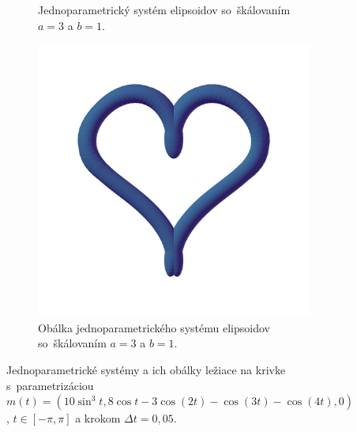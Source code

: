 \begin{figure}[h]
\begin{subfigure}[t]{0.49\textwidth}
        	\caption{Jednoparametrický systém elipsoidov so~škálovaním $a=3$ a $b=1$.}
        \label{fig:plocha13}
    \end{subfigure}
    \hfill
    \begin{subfigure}[t]{0.49\textwidth}
        \centering
        \includegraphics[width=\textwidth, trim=0mm 100mm 0mm 50mm, clip=true]{images/heart_envelope_ellipsoids2.png}
        	\caption{Obálka jednoparametrického systému elipsoidov so~škálovaním $a=3$ a $b=1$.}
        \label{fig:plocha14}
    \end{subfigure}
    \caption[Jednoparametrické systémy a ich obálky ležiace na krivke srdce.]{Jednoparametrické systémy a ich obálky ležiace na krivke s~parametrizáciou $m(t)=(10\sin^{3}t, 8 \cos t-3\cos(2t) -\cos(3t)-\cos (4t), 0)$, $t \in [-\pi, \pi]$ a krokom $\Delta t = 0,05.$}
    \label{fig:katalogIII}
\end{figure}

